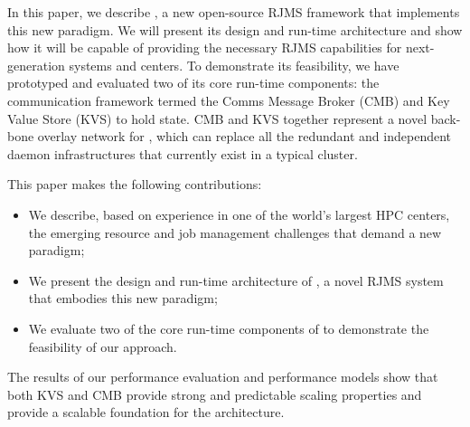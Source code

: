 In this paper, we describe \flux, a new open-source RJMS framework that implements
this new paradigm. We will present
its design and run-time architecture and show how it will be capable of providing
the necessary RJMS capabilities for next-generation systems and centers. To
demonstrate its feasibility, we have prototyped and evaluated two of its core run-time components:
%
%
%
the communication framework termed the Comms Message Broker (CMB)
and Key Value Store (KVS) to hold \flux state.
%
%
CMB and KVS together represent a novel back-bone overlay network for \flux,
which can replace all the redundant and independent
daemon infrastructures that currently exist in a typical cluster.

This paper makes the following contributions:
\begin{itemize}
\item{We describe, based on experience in one of the world's largest HPC centers, the emerging resource and job management challenges that demand a new paradigm;}
\item{We present the design and run-time architecture of \flux, a novel RJMS system that embodies this new paradigm;}
\item{We evaluate two of the core run-time components of \flux to demonstrate the feasibility of our approach.}
\end{itemize}

The results of our performance evaluation 
and performance models show that both KVS and CMB provide 
strong and predictable scaling properties and provide a scalable foundation 
for the \flux architecture.

